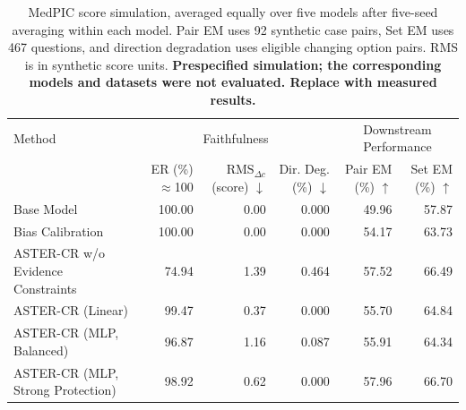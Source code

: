 \begin{table}[t]
\centering
\small
\setlength{\tabcolsep}{3pt}
\begin{tabularx}{\textwidth}{@{}>{\raggedright\arraybackslash}Xrrrrr@{}}
\toprule
Method & \multicolumn{3}{c}{Faithfulness} & \multicolumn{2}{c}{Downstream Performance} \\
\cmidrule(lr){2-4}\cmidrule(lr){5-6}
 & \shortstack{ER\\ (\%) $\approx$100} & \shortstack{$\mathrm{RMS}_{\Delta c}$\\ (score) $\downarrow$} & \shortstack{Dir. Deg.\\ (\%) $\downarrow$} & \shortstack{Pair EM\\ (\%) $\uparrow$} & \shortstack{Set EM\\ (\%) $\uparrow$} \\
\midrule
Base Model & 100.00 & 0.00 & 0.000 & 49.96 & 57.87 \\
Bias Calibration & 100.00 & 0.00 & 0.000 & 54.17 & 63.73 \\
ASTER-CR w/o Evidence Constraints & 74.94 & 1.39 & 0.464 & 57.52 & 66.49 \\
ASTER-CR (Linear) & 99.47 & 0.37 & 0.000 & 55.70 & 64.84 \\
ASTER-CR (MLP, Balanced) & 96.87 & 1.16 & 0.087 & 55.91 & 64.34 \\
ASTER-CR (MLP, Strong Protection) & 98.92 & 0.62 & 0.000 & 57.96 & 66.70 \\
\bottomrule
\end{tabularx}
\caption{MedPIC score simulation, averaged equally over five models after five-seed averaging within each model. Pair EM uses 92 synthetic case pairs, Set EM uses 467 questions, and direction degradation uses eligible changing option pairs. RMS is in synthetic score units. \textbf{Prespecified simulation; the corresponding models and datasets were not evaluated. Replace with measured results.}}
\label{tab:aster-main-13}
\end{table}

